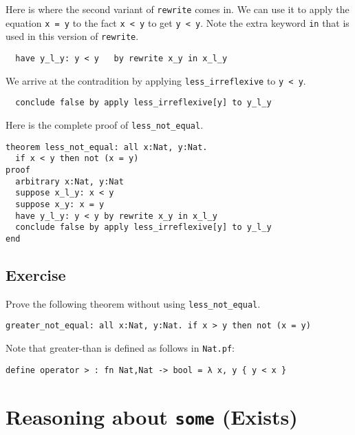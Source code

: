 \documentclass[12pt]{article}
\begin{document}
Here is where the second variant of \texttt{rewrite} comes in.  We can
use it to apply the equation \texttt{x = y} to the fact \texttt{x < y}
to get \texttt{y < y}.  Note the extra keyword \texttt{in} that is
used in this version of \texttt{rewrite}.

\begin{verbatim}
  have y_l_y: y < y   by rewrite x_y in x_l_y
\end{verbatim}

We arrive at the contradition by applying \texttt{less\_irreflexive}
to \texttt{y < y}.

\begin{verbatim}
  conclude false by apply less_irreflexive[y] to y_l_y
\end{verbatim}

Here is the complete proof of \texttt{less\_not\_equal}.

\begin{verbatim}
theorem less_not_equal: all x:Nat, y:Nat.
  if x < y then not (x = y)
proof
  arbitrary x:Nat, y:Nat
  suppose x_l_y: x < y
  suppose x_y: x = y
  have y_l_y: y < y by rewrite x_y in x_l_y
  conclude false by apply less_irreflexive[y] to y_l_y
end
\end{verbatim}

\subsection{Exercise}

Prove the following theorem without using \texttt{less\_not\_equal}.

\begin{verbatim}
greater_not_equal: all x:Nat, y:Nat. if x > y then not (x = y)
\end{verbatim}

Note that greater-than is defined as follows in \texttt{Nat.pf}:

\begin{verbatim}
define operator > : fn Nat,Nat -> bool = λ x, y { y < x }
\end{verbatim}

\pagebreak

\section{Reasoning about \texttt{some} (Exists)}
\label{sec:exists}
\end{document}
